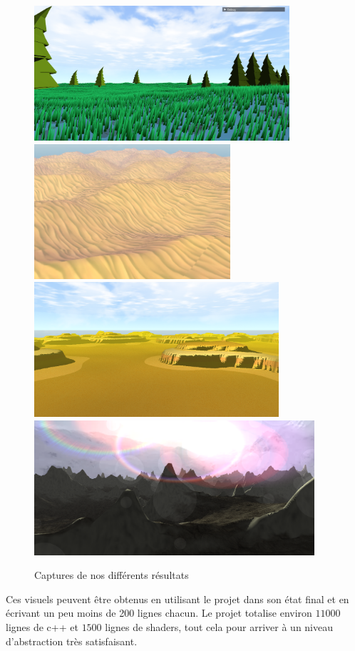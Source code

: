 \documentclass{EPUProjetDi}
\begin{document}
\begin{figure}[ht]
	\centering
	\includegraphics[height=5cm]{final_trees}
	\includegraphics[height=5cm]{final_desert}
	\includegraphics[height=5cm]{final_mesa}
	\includegraphics[height=5cm]{final_mountains}
	\caption{Captures de nos différents résultats}
	\label{fig:final}
\end{figure}

Ces visuels peuvent être obtenus en utilisant le projet dans son état final et en écrivant un peu moins de 200 lignes chacun. Le projet totalise environ $11000$ lignes de c++ et $1500$ lignes de shaders, tout cela pour arriver à un niveau d'abstraction très satisfaisant.
\end{document}
